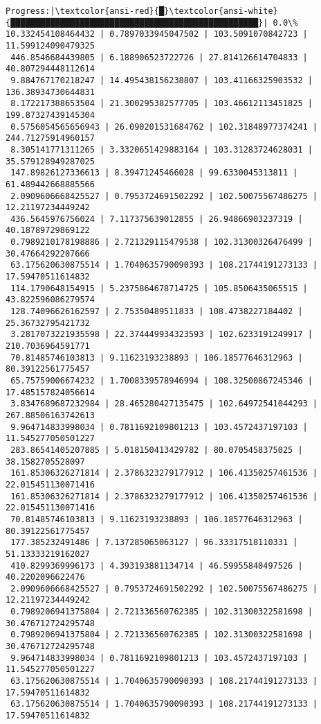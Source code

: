 \documentclass[11pt]{article}
\begin{document}
    \begin{Verbatim}[commandchars=\\\{\}]
 Progress:|\textcolor{ansi-red}{█}\textcolor{ansi-white}{██████████████████████████████████████████████████}| 0.0\% 10.332454108464432 | 0.7897033945047502 | 103.5091070842723 | 11.599124090479325
 446.8546684439805 | 6.188906523722726 | 27.814126614704833 | 40.807294448112614
 9.884767170218247 | 14.495438156238807 | 103.41166325903532 | 136.38934730644831
 8.172217388653504 | 21.300295382577705 | 103.46612113451825 | 199.87327439145304
 0.5756054565656943 | 26.090201531684762 | 102.31848977374241 | 244.71275914960157
 8.305141771311265 | 3.3320651429883164 | 103.31283724628031 | 35.579128949287025
 147.89826127336613 | 8.39471245466028 | 99.6330045313811 | 61.489442668885566
 2.0909606668425527 | 0.7953724691502292 | 102.50075567486275 | 12.21197234449242
 436.5645976756024 | 7.117375639012855 | 26.94866903237319 | 40.18789729869122
 0.7989210178198886 | 2.721329115479538 | 102.31300326476499 | 30.47664292207666
 63.175620630875514 | 1.7040635790090393 | 108.21744191273133 | 17.59470511614832
 114.1790648154915 | 5.2375864678714725 | 105.8506435065515 | 43.822596086279574
 128.74096626162597 | 2.75350489511833 | 108.4738227184402 | 25.36732795421732
 3.2817073221935598 | 22.374449934323593 | 102.6233191249917 | 210.7036964591771
 70.81485746103813 | 9.11623193238893 | 106.18577646312963 | 80.39122561775457
 65.75759006674232 | 1.7008339578946994 | 108.32500867245346 | 17.485157824056614
 3.8347689687232984 | 28.465280427135475 | 102.64972541044293 | 267.88506163742613
 9.964714833998034 | 0.7811692109801213 | 103.4572437197103 | 11.545277050501227
 283.86541405207885 | 5.018150413429782 | 80.0705458375025 | 38.1582705528097
 161.85306326271814 | 2.3786323279177912 | 106.41350257461536 | 22.015451130071416
 161.85306326271814 | 2.3786323279177912 | 106.41350257461536 | 22.015451130071416
 70.81485746103813 | 9.11623193238893 | 106.18577646312963 | 80.39122561775457
 177.385232491486 | 7.137285065063127 | 96.33317518110331 | 51.13333219162027
 410.8299369996173 | 4.393193881134714 | 46.59955840497526 | 40.2202096622476
 2.0909606668425527 | 0.7953724691502292 | 102.50075567486275 | 12.21197234449242
 0.7989206941375804 | 2.721336560762385 | 102.31300322581698 | 30.476712724295748
 0.7989206941375804 | 2.721336560762385 | 102.31300322581698 | 30.476712724295748
 9.964714833998034 | 0.7811692109801213 | 103.4572437197103 | 11.545277050501227
 63.175620630875514 | 1.7040635790090393 | 108.21744191273133 | 17.59470511614832
 63.175620630875514 | 1.7040635790090393 | 108.21744191273133 | 17.59470511614832

\end{Verbatim}
\end{document}
